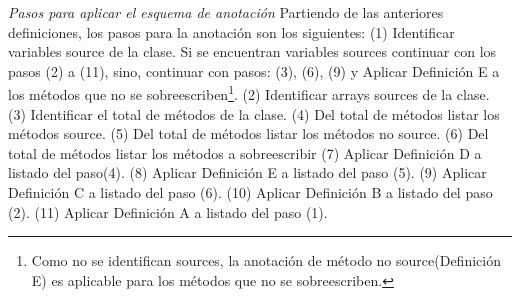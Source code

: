 \textit{Pasos para aplicar el esquema de anotación}\newline
Partiendo de las anteriores definiciones, los pasos para la anotación son los
siguientes:\newline
(1) Identificar variables source de la clase. Si se encuentran variables sources
continuar con los pasos (2) a (11), sino, continuar con pasos: (3), (6), (9) y
Aplicar Definición E a los métodos que no se sobreescriben\footnote{Como no se
identifican sources, la anotación de método no source(Definición E) es
aplicable para los métodos que no se sobreescriben.}.
(2) Identificar arrays sources de la clase.
(3) Identificar el total de métodos de la clase.\newline
(4) Del total de métodos listar los métodos source.\newline
(5) Del total de métodos listar los métodos no source.\newline
(6) Del total de métodos listar los métodos a sobreescribir\newline
(7) Aplicar Definición D a listado del paso(4).\newline
(8) Aplicar Definición E a listado del paso (5).\newline
(9) Aplicar Definición C a listado del paso (6).\newline
(10) Aplicar Definición B a listado del paso (2).\newline
(11) Aplicar Definición A a listado del paso (1).


